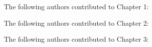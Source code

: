 \noindent The following authors contributed to Chapter 1: 

\noindent The following authors contributed to Chapter 2: 

\noindent The following authors contributed to Chapter 3: 